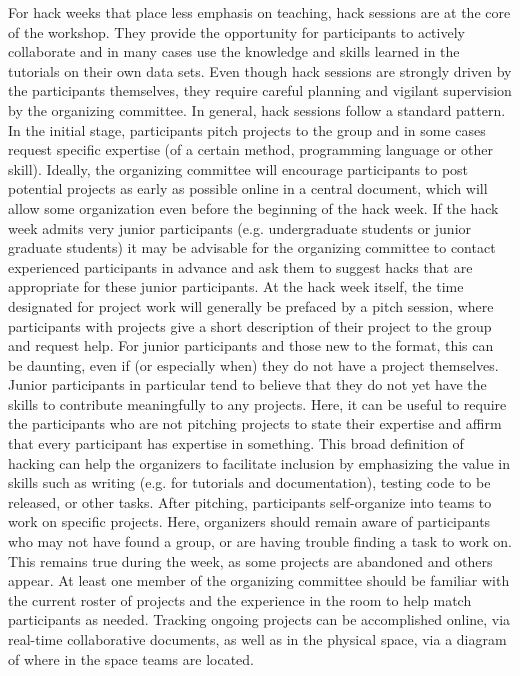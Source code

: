 \documentclass{aastex62}
\begin{document}
For hack weeks that place less emphasis on teaching, hack sessions are at the core of the workshop. They provide the opportunity for participants to actively collaborate and in many cases use the knowledge and skills learned in the tutorials on their own data sets. Even though hack sessions are strongly driven by the participants themselves, they require careful planning and vigilant supervision by the organizing committee. In general, hack sessions follow a standard pattern. In the initial stage, participants pitch projects to the group and in some cases request specific expertise (of a certain method, programming language or other skill). Ideally, the organizing committee will encourage participants to post potential projects as early as possible online in a central document, which will allow some organization even before the beginning of the hack week. If the hack week admits very junior participants (e.g. undergraduate students or junior graduate students) it may be advisable for the organizing committee to contact experienced participants in advance and ask them to suggest hacks that are appropriate for these junior participants.
At the hack week itself, the time designated for project work will generally be prefaced by a pitch session, where participants with projects give a short description of their project to the group and request help. For junior participants and those new to the format, this can be daunting, even if (or especially when) they do not have a project themselves. Junior participants in particular tend to believe that they do not yet have the skills to contribute meaningfully to any projects. Here, it can be useful to require the participants who are not pitching projects to state their expertise and affirm that every participant has expertise in something. This broad definition of hacking can help the organizers to facilitate inclusion by emphasizing the value in skills such as writing (e.g. for tutorials and documentation), testing code to be released, or other tasks. After pitching, participants self-organize into teams to work on specific projects. Here, organizers should remain aware of participants who may not have found a group, or are having trouble finding a task to work on. This remains true during the week, as some projects are abandoned and others appear. At least one member of the organizing committee should be familiar with the current roster of projects and the experience in the room to help match participants as needed. Tracking ongoing projects can be accomplished online, via real-time collaborative documents, as well as in the physical space, via a diagram of where in the space teams are located.
\end{document}
